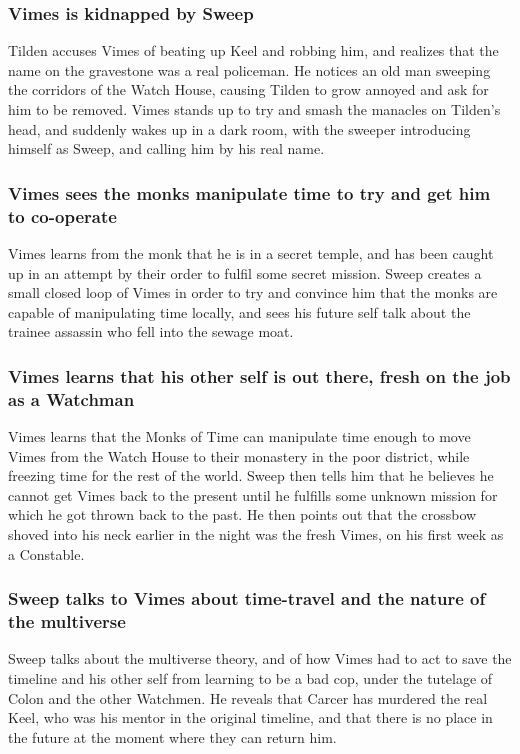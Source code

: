 \subsubsection{\Gls{Vimes} is kidnapped by \Gls{Sweep}}
\Gls{Tilden} accuses \Gls{Vimes} of beating up \Gls{Keel} and robbing him, and realizes that
the name on the gravestone was a real policeman. He notices an old man sweeping the corridors of
the Watch House, causing \Gls{Tilden} to grow annoyed and ask for him to be removed. \Gls{Vimes}
stands up to try and smash the manacles on \Gls{Tilden}'s head, and suddenly wakes up in a dark
room, with the sweeper introducing himself as \Gls{Sweep}, and calling him by his real name.

\subsubsection{\Gls{Vimes} sees the monks manipulate time to try and get him to co-operate}
\Gls{Vimes} learns from the monk that he is in a secret temple, and has been caught up in an
attempt by their order to fulfil some secret mission. \Gls{Sweep} creates a small closed loop of
\Gls{Vimes} in order to try and convince him that the monks are capable of manipulating time
locally, and sees his future self talk about the trainee assassin who fell into the sewage moat.

\subsubsection{\Gls{Vimes} learns that his other self is out there, fresh on the job as a Watchman}
\Gls{Vimes} learns that the Monks of Time can manipulate time enough to move \Gls{Vimes} from the
Watch House to their monastery in the poor district, while freezing time for the rest of the world.
\Gls{Sweep} then tells him that he believes he cannot get \Gls{Vimes} back to the present until he
fulfills some unknown mission for which he got thrown back to the past. He then points out that the
crossbow shoved into his neck earlier in the night was the fresh \Gls{Vimes}, on his first week as a
Constable.

\subsubsection{\Gls{Sweep} talks to \Gls{Vimes} about time-travel and the nature of the multiverse}
\Gls{Sweep} talks about the multiverse theory, and of how \Gls{Vimes} had to act to save the
timeline and his other self from learning to be a bad cop, under the tutelage of \Gls{Colon} and
the other Watchmen. He reveals that \Gls{Carcer} has murdered the real \Gls{Keel}, who was his
mentor in the original timeline, and that there is no place in the future at the moment where they
can return him.

